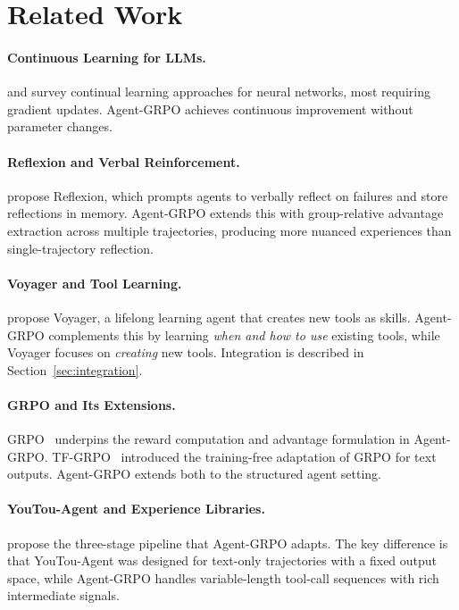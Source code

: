 \documentclass[11pt]{article}
\begin{document}
\section{Related Work}
\label{sec:related}

\paragraph{Continuous Learning for LLMs.}
\cite{mitchell2022memory} and \cite{de2021continual} survey continual
learning approaches for neural networks, most requiring gradient updates.
Agent-GRPO achieves continuous improvement without parameter changes.

\paragraph{Reflexion and Verbal Reinforcement.}
\cite{shinn2023reflexion} propose Reflexion, which prompts agents to verbally
reflect on failures and store reflections in memory. Agent-GRPO extends this
with group-relative advantage extraction across multiple trajectories,
producing more nuanced experiences than single-trajectory reflection.

\paragraph{Voyager and Tool Learning.}
\cite{wang2023voyager} propose Voyager, a lifelong learning agent that
creates new tools as skills. Agent-GRPO complements this by learning
\emph{when and how to use} existing tools, while Voyager focuses on
\emph{creating} new tools. Integration is described in Section~\ref{sec:integration}.

\paragraph{GRPO and Its Extensions.}
GRPO~\cite{shao2024deepseekmath} underpins the reward computation and
advantage formulation in Agent-GRPO. TF-GRPO~\cite{hanzo2026aso} introduced
the training-free adaptation of GRPO for text outputs. Agent-GRPO extends
both to the structured agent setting.

\paragraph{YouTou-Agent and Experience Libraries.}
\cite{tencent2025youtoagent} propose the three-stage pipeline that
Agent-GRPO adapts. The key difference is that YouTou-Agent was designed for
text-only trajectories with a fixed output space, while Agent-GRPO handles
variable-length tool-call sequences with rich intermediate signals.
\end{document}
